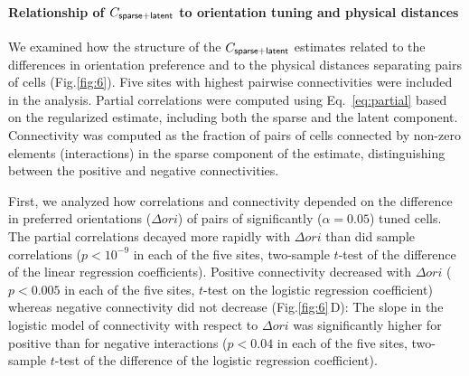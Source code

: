 \documentclass[10pt]{article}
\newcommand{\figref}[2]{Fig.\;\ref{fig:#1}\,#2}
\begin{document}
\paragraph{Relationship of $C_{\sf sparse+latent}$ to orientation tuning and physical distances}

We examined how the structure of the $C_{\sf sparse+latent}$ estimates related to the differences in orientation preference and to the physical distances separating pairs of cells (Fig.\;\ref{fig:6}).  Five sites with highest pairwise connectivities were included in the analysis. Partial correlations were computed using Eq.~\ref{eq:partial} based on the regularized estimate, including both the sparse and the latent component. Connectivity was computed as the fraction of pairs of cells connected by non-zero elements (interactions) in the sparse component of the estimate, distinguishing between the positive and negative connectivities. 

First, we analyzed how correlations and connectivity depended on the difference in preferred orientations ($\Delta ori$) of pairs of significantly ($\alpha=0.05$) tuned cells. The partial correlations decayed more rapidly with $\Delta ori$ than did sample correlations ($p<10^{-9}$ in each of the five sites, two-sample $t$-test of the difference of the linear regression coefficients). Positive connectivity decreased with $\Delta ori$ ($p<0.005$ in each of the five sites, $t$-test on the logistic regression coefficient) whereas negative connectivity did not decrease (\figref{6}{D}): The slope in the logistic model of connectivity with respect to $\Delta ori$ was significantly higher for positive than for negative interactions ($p<0.04$ in each of the five sites, two-sample $t$-test of the difference of the logistic regression coefficient). 
\end{document}
